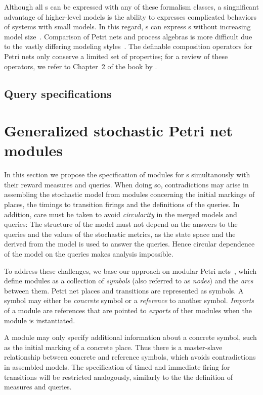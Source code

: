 Although all s can be expressed with any of these formalism classes, a singnificant advantage of higher-level models is the ability to expresses complicated behaviors of systems with small models. In this regard, s can express s without increasing model size~\citep{Vernon86comparison}. Comparison of Petri nets and process algebras is more difficult due to the vastly differing modeling styles~\citep{Donatelli95comparison}. The definable composition operators for Petri nets only conserve a limited set of properties; for a review of these operators, we refer to Chapter~2 of the book by \citet{Hejiao12pppnpa}.

\subsection{Query specifications}

\section{Generalized stochastic Petri net modules}

In this section we propose the specification of modules for s simultanously with their reward measures and queries. When doing so, contradictions may arise in assembling the stochastic model from modules concerning the initial markings of places, the timings to transition firings and the definitions of the queries. In addition, care must be taken to avoid \emph{circularity} in the merged models and queries: The structure of the model must not depend on the answers to the queries and the values of the stochastic metrics, as the state space and the  derived from the model is used to answer the queries. Hence circular dependence of the model on the queries makes analysis impossible.

To address these challenges, we base our approach on modular Petri nets~\citep{Kindler01modular}, which define modules as a collection of \emph{symbols} (also referred to as \emph{nodes}) and the \emph{arcs} between them. Petri net places and transitions are represented as symbols. A symbol may either be \emph{concrete} symbol or a \emph{reference} to another symbol. \emph{Imports} of a module are references that are pointed to \emph{exports} of ther modules when the module is instantiated.

A module may only specify additional information about a concrete symbol, such as the initial marking of a concrete place. Thus there is a master-slave relationship between concrete and reference symbols, which avoids contradictions in assembled models. The specification of timed and immediate firing for transitions will be restricted analogously, similarly to the the definition of measures and queries.


